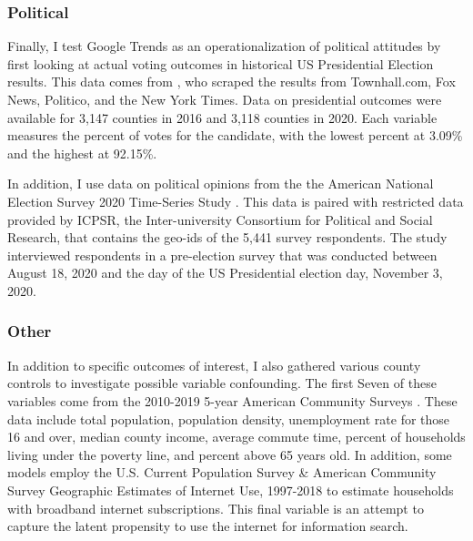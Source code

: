 \subsubsection{Political}

Finally, I test Google Trends as an operationalization of political
attitudes by first looking at actual voting outcomes in historical US
Presidential Election results. This data comes from  \citet{pres_data}, who scraped the
results from Townhall.com, Fox News, Politico, and the New York Times. Data on 
presidential outcomes were available for 3,147 counties in 2016 and
3,118 counties in 2020. Each variable measures the percent of votes
for the candidate, with the lowest percent at 3.09\% and the highest at 92.15\%.

In addition, I use data on political opinions from the the American National
Election Survey 2020 Time-Series Study \citep{anes_data}. This data is paired with
restricted data provided by ICPSR, the Inter-university Consortium for Political
and Social Research, that contains the geo-ids of the 5,441
survey respondents. The study interviewed respondents in a pre-election survey
that was conducted between August 18, 2020 and the day of the US Presidential
election day, November 3, 2020.


\subsubsection{Other}

In addition to specific outcomes of interest, I also gathered various county
controls to investigate possible variable confounding. The first Seven of these
variables come from the 2010-2019 5-year American Community Surveys
\citep{acs2019, acs2018, acs2017, acs2016, acs2015, acs2014, acs2013, acs2012, acs2011, acs2010}. 
These data include total population, population density,
unemployment rate for those 16 and over, median county income, average commute
time, percent of households living under the poverty line, and percent above 65
years old. In addition, some models employ the U.S. Current Population Survey \&
American Community Survey Geographic Estimates of Internet Use, 1997-2018
\citep{internet_use} to estimate households with broadband internet subscriptions.
This final variable is an attempt to capture the latent propensity to use the
internet for information search.


